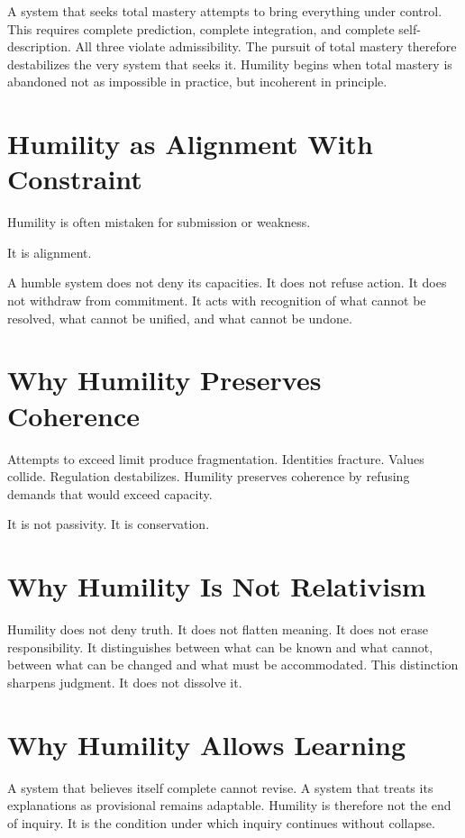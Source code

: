 \documentclass[11pt,twoside,openright]{book}
\begin{document}
A system that seeks total mastery attempts to bring everything under control. This requires complete prediction, complete integration, and complete self-description. All three violate admissibility. The pursuit of total mastery therefore destabilizes the very system that seeks it. Humility begins when total mastery is abandoned not as impossible in practice, but incoherent in principle.

\section*{Humility as Alignment With Constraint}

Humility is often mistaken for submission or weakness.

It is alignment.

A humble system does not deny its capacities. It does not refuse action. It does not withdraw from commitment. It acts with recognition of what cannot be resolved, what cannot be unified, and what cannot be undone.

\section*{Why Humility Preserves Coherence}

Attempts to exceed limit produce fragmentation. Identities fracture. Values collide. Regulation destabilizes. Humility preserves coherence by refusing demands that would exceed capacity.

It is not passivity. It is conservation.

\section*{Why Humility Is Not Relativism}

Humility does not deny truth. It does not flatten meaning. It does not erase responsibility. It distinguishes between what can be known and what cannot, between what can be changed and what must be accommodated. This distinction sharpens judgment. It does not dissolve it.

\section*{Why Humility Allows Learning}

A system that believes itself complete cannot revise. A system that treats its explanations as provisional remains adaptable. Humility is therefore not the end of inquiry. It is the condition under which inquiry continues without collapse.
\end{document}
